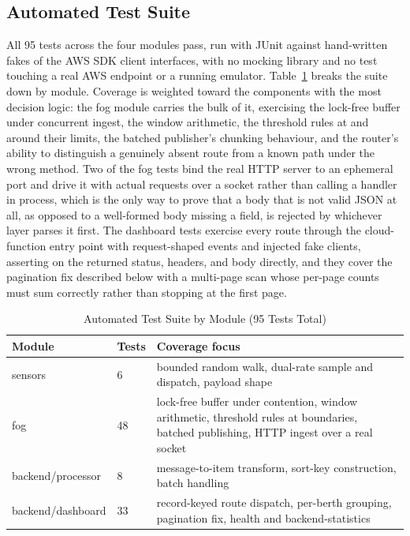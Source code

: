 \documentclass[conference]{IEEEtran}
\begin{document}
\subsection{Automated Test Suite}

All 95 tests across the four modules pass, run with JUnit against hand-written fakes of the AWS SDK client interfaces, with no mocking library and no test touching a real AWS endpoint or a running emulator. Table~\ref{tab:tests} breaks the suite down by module. Coverage is weighted toward the components with the most decision logic: the fog module carries the bulk of it, exercising the lock-free buffer under concurrent ingest, the window arithmetic, the threshold rules at and around their limits, the batched publisher's chunking behaviour, and the router's ability to distinguish a genuinely absent route from a known path under the wrong method. Two of the fog tests bind the real HTTP server to an ephemeral port and drive it with actual requests over a socket rather than calling a handler in process, which is the only way to prove that a body that is not valid JSON at all, as opposed to a well-formed body missing a field, is rejected by whichever layer parses it first. The dashboard tests exercise every route through the cloud-function entry point with request-shaped events and injected fake clients, asserting on the returned status, headers, and body directly, and they cover the pagination fix described below with a multi-page scan whose per-page counts must sum correctly rather than stopping at the first page.

\begin{table}[!t]
\caption{Automated Test Suite by Module (95 Tests Total)}
\label{tab:tests}
\centering
\footnotesize
\begin{tabular}{|>{\raggedright\arraybackslash}p{2.0cm}|p{0.9cm}|>{\raggedright\arraybackslash}p{4.2cm}|}
\hline
\textbf{Module} & \textbf{Tests} & \textbf{Coverage focus} \\
\hline
sensors & 6 & bounded random walk, dual-rate sample and dispatch, payload shape \\
\hline
fog & 48 & lock-free buffer under contention, window arithmetic, threshold rules at boundaries, batched publishing, HTTP ingest over a real socket \\
\hline
backend/processor & 8 & message-to-item transform, sort-key construction, batch handling \\
\hline
backend/dashboard & 33 & record-keyed route dispatch, per-berth grouping, pagination fix, health and backend-statistics \\
\hline
\end{tabular}
\end{table}
\end{document}
